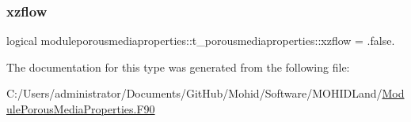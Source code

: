 \subsubsection{\texorpdfstring{xzflow}{xzflow}}
{\footnotesize\ttfamily logical moduleporousmediaproperties\+::t\+\_\+porousmediaproperties\+::xzflow = .false.\hspace{0.3cm}{\ttfamily [private]}}



The documentation for this type was generated from the following file\+:\begin{DoxyCompactItemize}
\item 
C\+:/\+Users/administrator/\+Documents/\+Git\+Hub/\+Mohid/\+Software/\+M\+O\+H\+I\+D\+Land/\mbox{\hyperlink{_module_porous_media_properties_8_f90}{Module\+Porous\+Media\+Properties.\+F90}}\end{DoxyCompactItemize}
